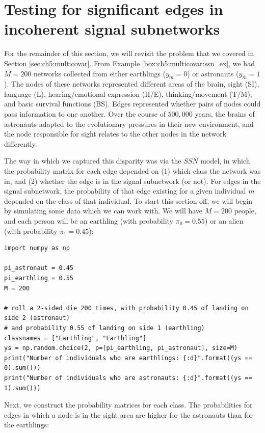 \section{Testing for significant edges in incoherent signal subnetworks}
\label{sec:ch9:ssn_incoherent}

For the remainder of this section, we will revisit the problem that we covered in Section \ref{sec:ch5:multicovar}. From Example \ref{box:ch5:multicovar:ssn_ex}, we had $M=200$ networks collected from either earthlings ($y_m = 0$) or astronauts ($y_m = 1$). The nodes of these networks represented different areas of the brain, sight (SI), language (L), hearing/emotional expression (H/E), thinking/movement (T/M), and basic survival functions (BS). Edges represented whether pairs of nodes could pass information to one another. Over the course of $500,000$ years, the brains of astronauts adapted to the evolutionary pressures in their new environment, and the node responsible for sight relates to the other nodes in the network differently. 

The way in which we captured this disparity was via the $SSN$ model, in which the probability matrix for each edge depended on (1) which class the network was in, and (2) whether the edge is in the signal subnetwork (or not). For edges in the signal subnetwork, the probability of that edge existing for a given individual $m$ depended on the class of that individual. To start this section off, we will begin by simulating some data which we can work with. We will have $M=200$ people, and each person will be an earthling (with probability $\pi_0 = 0.55$) or an alien (with probability $\pi_1 = 0.45$):

\begin{lstlisting}[style=python]
import numpy as np

pi_astronaut = 0.45
pi_earthling = 0.55
M = 200

# roll a 2-sided die 200 times, with probability 0.45 of landing on side 2 (astronaut)
# and probability 0.55 of landing on side 1 (earthling)
classnames = ["Earthling", "Earthling"]
ys = np.random.choice(2, p=[pi_earthling, pi_astronaut], size=M)
print("Number of individuals who are earthlings: {:d}".format((ys == 0).sum()))
print("Number of individuals who are astronauts: {:d}".format((ys == 1).sum()))
\end{lstlisting}

Next, we construct the probability matrices for each class. The probabilities for edges in which a node is in the sight area are higher for the astronauts than for the earthlings:

